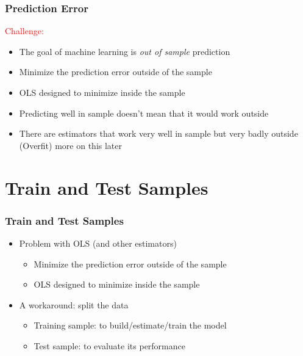 \documentclass[
  shownotes,
  xcolor={svgnames},
  hyperref={colorlinks,citecolor=DarkBlue,linkcolor=DarkRed,urlcolor=DarkBlue}
  ]{beamer}
\begin{document}
\begin{frame}
\frametitle{Prediction Error}

\textcolor{red}{Challenge:}

\begin{itemize}
  \item The  goal of machine learning is \emph{out of sample} prediction
  \bigskip
  \item Minimize the prediction error outside of the sample
  \bigskip
  \item OLS designed to minimize inside the sample
  \bigskip
  \item Predicting well in sample doesn't mean that it would work outside
  \bigskip
  \item There are estimators that work very well in sample but very badly outside (Overfit) {\tiny more on this later}
  
\end{itemize}

\end{frame}


\section{Train and Test Samples}
\begin{frame}
\frametitle{Train and Test Samples}


\begin{itemize}
  \item Problem with OLS (and other estimators)
  \medskip
  \begin{itemize}
    \item Minimize the prediction error outside of the sample
    \medskip
    \item OLS designed to minimize inside the sample  
  \end{itemize}
  \bigskip
  
  \item A workaround: split the data
  \medskip
  \begin{itemize}
    \item  Training sample: to build/estimate/train the model
    \medskip
    \item  Test sample:  to evaluate its performance 
  \end{itemize}
\end{itemize}

\end{frame}
\end{document}
